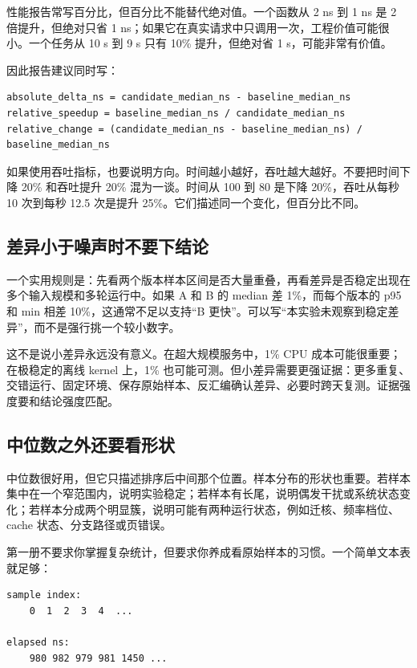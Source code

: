 性能报告常写百分比，但百分比不能替代绝对值。一个函数从 2 ns 到 1 ns 是 2 倍提升，但绝对只省 1 ns；如果它在真实请求中只调用一次，工程价值可能很小。一个任务从 10 s 到 9 s 只有 10\% 提升，但绝对省 1 s，可能非常有价值。

因此报告建议同时写：

\begin{lstlisting}
absolute_delta_ns = candidate_median_ns - baseline_median_ns
relative_speedup = baseline_median_ns / candidate_median_ns
relative_change = (candidate_median_ns - baseline_median_ns) / baseline_median_ns
\end{lstlisting}

如果使用吞吐指标，也要说明方向。时间越小越好，吞吐越大越好。不要把时间下降 20\% 和吞吐提升 20\% 混为一谈。时间从 100 到 80 是下降 20\%，吞吐从每秒 10 次到每秒 12.5 次是提升 25\%。它们描述同一个变化，但百分比不同。

\subsection{差异小于噪声时不要下结论}

一个实用规则是：先看两个版本样本区间是否大量重叠，再看差异是否稳定出现在多个输入规模和多轮运行中。如果 A 和 B 的 median 差 1\%，而每个版本的 p95 和 min 相差 10\%，这通常不足以支持“B 更快”。可以写“本实验未观察到稳定差异”，而不是强行挑一个较小数字。

这不是说小差异永远没有意义。在超大规模服务中，1\% CPU 成本可能很重要；在极稳定的离线 kernel 上，1\% 也可能可测。但小差异需要更强证据：更多重复、交错运行、固定环境、保存原始样本、反汇编确认差异、必要时跨天复测。证据强度要和结论强度匹配。

\subsection{中位数之外还要看形状}

中位数很好用，但它只描述排序后中间那个位置。样本分布的形状也重要。若样本集中在一个窄范围内，说明实验稳定；若样本有长尾，说明偶发干扰或系统状态变化；若样本分成两个明显簇，说明可能有两种运行状态，例如迁核、频率档位、cache 状态、分支路径或页错误。

第一册不要求你掌握复杂统计，但要求你养成看原始样本的习惯。一个简单文本表就足够：

\begin{lstlisting}
sample index:
    0  1  2  3  4  ...

elapsed ns:
    980 982 979 981 1450 ...
\end{lstlisting}

